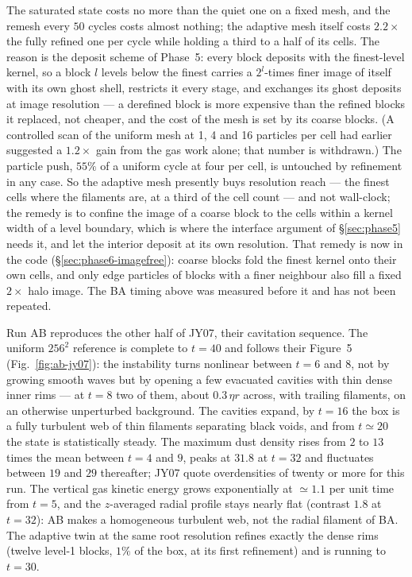 \documentclass[11pt]{article}
\begin{document}
The saturated state costs no more than the quiet one on a fixed mesh, and the remesh
every $50$ cycles costs almost nothing; the adaptive mesh itself costs $2.2\times$ the
fully refined one per cycle while holding a third to a half of its cells. The reason is
the deposit scheme of Phase~5: every block deposits with the finest-level kernel, so a
block $l$ levels below the finest carries a $2^l$-times finer image of itself with its
own ghost shell, restricts it every stage, and exchanges its ghost deposits at image
resolution --- a derefined block is more expensive than the refined blocks it replaced,
not cheaper, and the cost of the mesh is set by its coarse blocks. (A controlled scan of
the uniform mesh at 1, 4 and 16 particles per cell had earlier suggested a $1.2\times$
gain from the gas work alone; that number is withdrawn.) The particle push, $55\%$ of a
uniform cycle at four per cell, is untouched by refinement in any case. So the adaptive
mesh presently buys resolution reach --- the finest cells where the filaments are, at a
third of the cell count --- and not wall-clock; the remedy is to confine the image of a
coarse block to the cells within a kernel width of a level boundary, which is where the
interface argument of \S\ref{sec:phase5} needs it, and let the interior deposit at its
own resolution. That remedy is now in the code (\S\ref{sec:phase6-imagefree}): coarse blocks
fold the finest kernel onto their own cells, and only edge particles of blocks with a
finer neighbour also fill a fixed $2\times$ halo image. The BA timing above was measured
before it and has not been repeated.

Run AB reproduces the other half of JY07, their cavitation sequence. The uniform $256^2$
reference is complete to $t = 40$ and follows their Figure~5 (Fig.~\ref{fig:ab-jy07}): the
instability turns nonlinear between $t = 6$ and $8$, not by growing smooth waves but by
opening a few evacuated cavities with thin dense inner rims --- at $t = 8$ two of them,
about $0.3\,\eta r$ across, with trailing filaments, on an otherwise unperturbed
background. The cavities expand, by $t = 16$ the box is a fully turbulent web of thin
filaments separating black voids, and from $t \simeq 20$ the state is statistically
steady. The maximum dust density rises from $2$ to $13$ times the mean between $t = 4$ and
$9$, peaks at $31.8$ at $t = 32$ and fluctuates between $19$ and $29$ thereafter; JY07
quote overdensities of twenty or more for this run. The vertical gas kinetic energy grows
exponentially at $\simeq 1.1$ per unit time from $t = 5$, and the $z$-averaged radial
profile stays nearly flat (contrast $1.8$ at $t = 32$): AB makes a homogeneous turbulent
web, not the radial filament of BA. The adaptive twin at the same root resolution refines
exactly the dense rims (twelve level-1 blocks, $1\%$ of the box, at its first refinement)
and is running to $t = 30$.
\end{document}
